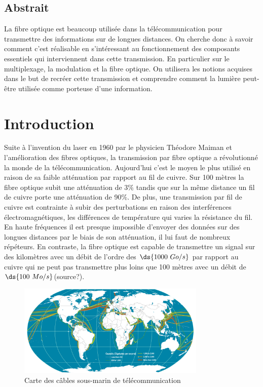\documentclass[oneside]{book}
\begin{document}
	

	
	
	\vfill
	\subsection*{Abstrait}
	La fibre optique est beaucoup utilisée dans la télécommunication pour transmettre des informations sur de longues distances. On cherche donc à savoir comment c'est réalisable en s'intéressant au fonctionnement des composants essentiels qui interviennent dans cette transmission. En particulier sur le multiplexage, la modulation et la fibre optique. On utilisera les notions acquises dans le but de recréer cette transmission et comprendre comment la lumière peut-être utilisée comme porteuse d'une information.  

	\newpage

	\thispagestyle{nohead}

	\section{Introduction}
	Suite à l'invention du laser en 1960 par le physicien Théodore Maiman et l'amélioration des fibres optiques, la transmission par fibre optique a révolutionné la monde de la télécommunication. Aujourd'hui c'est le moyen le plus utilisé en raison de sa faible atténuation par rapport au fil de cuivre. Sur 100 mètres la fibre optique subit une atténuation de 3\% tandis que sur la même distance un fil de cuivre porte une atténuation de 90\%\cite{attenuation}. De plus, une transmission par fil de cuivre est contrainte à subir des perturbations en raison des interférences électromagnétiques, les différences de température qui varies la résistance du fil. En haute fréquences il est presque impossible d'envoyer des données sur des longues distances par le biais de son atténuation, il lui faut de nombreux répéteurs. En contraste, la fibre optique est capable de transmettre un signal sur des kilomètres avec un débit de l'ordre des $\ds{1000\ Go/s}$ par rapport au cuivre qui ne peut pas transmettre plus loins que 100 mètres avec un débit de $\ds{100\ Mo/s}$(source?).


	\begin{figure}[ht!]
		\centering
		\includegraphics[width=0.8\textwidth]{./object/submarine.png}
		\caption{Carte des câbles sous-marin de télécommunication}
		\label{fig:submarine}
	\end{figure}
\end{document}
